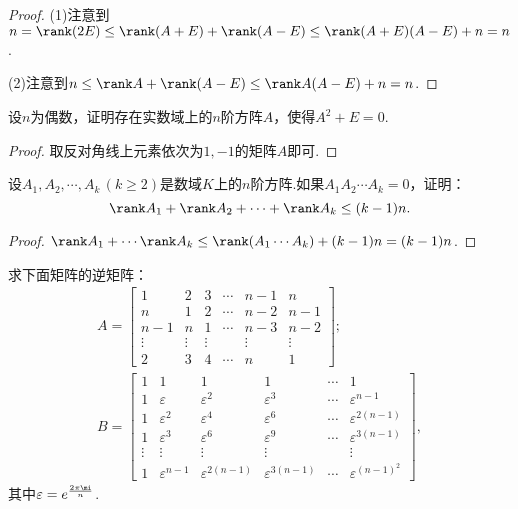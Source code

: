 \begin{proof}
	(1)注意到$n=\rank(2E)\le\rank(A+E)+\rank(A-E)\le\rank(A+E)(A-E)+n=n$.\par
	(2)注意到$n\le\rank A+\rank(A-E)\le\rank A(A-E)+n=n$.
\end{proof}
\begin{prob}[8]
	设$n$为偶数，证明存在实数域上的$n$阶方阵$A$，使得$A^2+E=0$.
\end{prob}
\begin{proof}
	取反对角线上元素依次为$1,-1$的矩阵$A$即可.
\end{proof}
\begin{prob}[9]
	设$A_1,A_2,\cdots,A_k\,(k\ge2)$是数域$K$上的$n$阶方阵.如果$A_1A_2\cdots A_k=0$，证明：
	\[
		\rank A_1+\rank A_2+\cdots+\rank A_k\le(k-1)n.
	\]
\end{prob}
\begin{proof}
	$\rank A_1+\cdots\rank A_k\le\rank(A_1\cdots A_k)+(k-1)n=(k-1)n$.
\end{proof}
\begin{prob}[14]
	求下面矩阵的逆矩阵：
	\begin{gather*}
		A=\begin{bmatrix}
			1      & 2      & 3      & \cdots & n-1    & n      \\
			n      & 1      & 2      & \cdots & n-2    & n-1    \\
			n-1    & n      & 1      & \cdots & n-3    & n-2    \\
			\vdots & \vdots & \vdots &        & \vdots & \vdots \\
			2      & 3      & 4      & \cdots & n      & 1
		\end{bmatrix};\\
		B=\begin{bmatrix}
			1      & 1                 & 1                    & 1                    & \cdots & 1                     \\
			1      & \varepsilon       & \varepsilon^2        & \varepsilon^3        & \cdots & \varepsilon^{n-1}     \\
			1      & \varepsilon^2     & \varepsilon^4        & \varepsilon^6        & \cdots & \varepsilon^{2(n-1)}  \\
			1      & \varepsilon^3     & \varepsilon^6        & \varepsilon^9        & \cdots & \varepsilon^{3(n-1)}  \\
			\vdots & \vdots            & \vdots               & \vdots               &        & \vdots                \\
			1      & \varepsilon^{n-1} & \varepsilon^{2(n-1)} & \varepsilon^{3(n-1)} & \cdots & \varepsilon^{(n-1)^2}
		\end{bmatrix},
	\end{gather*}
	其中$\varepsilon=e^{\frac{2\pi\mi}{n}}$.
\end{prob}
